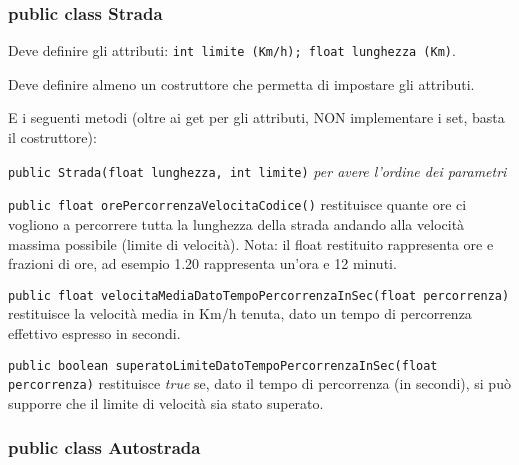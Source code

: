 \documentclass[a4paper,12pt]{article}
\begin{document}

\subsubsection{public class Strada}

Deve definire gli attributi: \texttt{int limite (Km/h); float lunghezza 
(Km)}.

Deve definire almeno un costruttore che permetta di impostare gli attributi.

E i seguenti metodi (oltre ai get per gli attributi, NON implementare i set, 
basta il costruttore):

\begin{compactitem}

\item\texttt{public Strada(float lunghezza, int limite)} \textit{per avere l'ordine dei parametri}


\item\texttt{public float orePercorrenzaVelocitaCodice()} restituisce quante 
ore ci vogliono a percorrere tutta la lunghezza della strada andando alla 
velocità massima possibile (limite di velocità). Nota: il float restituito rappresenta
ore e frazioni di ore, ad esempio 1.20 rappresenta un'ora e 12 minuti.

\item\texttt{public float velocitaMediaDatoTempoPercorrenzaInSec(float 
percorrenza)} restituisce la velocità media in Km/h tenuta, dato un tempo di percorrenza 
effettivo espresso in secondi.

\item\texttt{public boolean superatoLimiteDatoTempoPercorrenzaInSec(float 
percorrenza)} restituisce \textit{true} se, dato il tempo di percorrenza (in secondi), si può 
supporre che il limite di velocità sia stato superato.

\end{compactitem}





\subsubsection{public class Autostrada}
\end{document}

